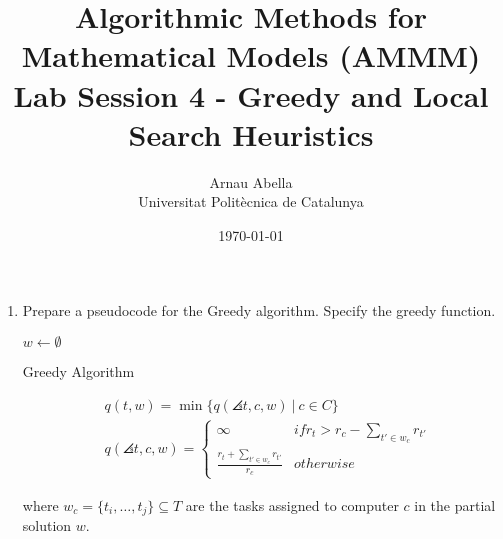 \documentclass[12pt, a4paper]{article}
\title{%
  \vspace{-10ex}
  \Large{Algorithmic Methods for Mathematical Models (AMMM)} \\
  \large{Lab Session 4 - Greedy and Local Search Heuristics}
}
\author{%
  Arnau Abella \\
  \large{Universitat Polit\`ecnica de Catalunya}
}
\date{\today}
\begin{document}
\maketitle

\vspace{5ex}
\begin{enumerate}[label=(\alph*)]
    \item Prepare a pseudocode for the Greedy algorithm. Specify the greedy function.

    \begin{algorithm}[H]
      \SetAlgoLined
      \DontPrintSemicolon
      $w \leftarrow \emptyset$\;

      \;
      \caption{Greedy Algorithm}
    \end{algorithm}

    \begin{figure}[H]
      \begin{align*}
        &q(t,w) = \min \{ q(\angles{t, c}, w) \ | \ c \in C \}\\
        &q(\angles{t, c}, w) =
          \begin{cases}
            \infty& if r_{t} > r_{c} - \sum_{t' \in w_{c}}r_{t'}  \\
            \frac{r_{t} + \sum_{t' \in w_{c}}r_{t'}}{r_{c}} & otherwise
          \end{cases}
      \end{align*}
    \end{figure}

    where $w_{c} = \{t_{i}, \ldots, t_{j} \} \subseteq T$ are the tasks assigned to computer $c$ in the partial solution $w$.


\end{enumerate}
\end{document}
